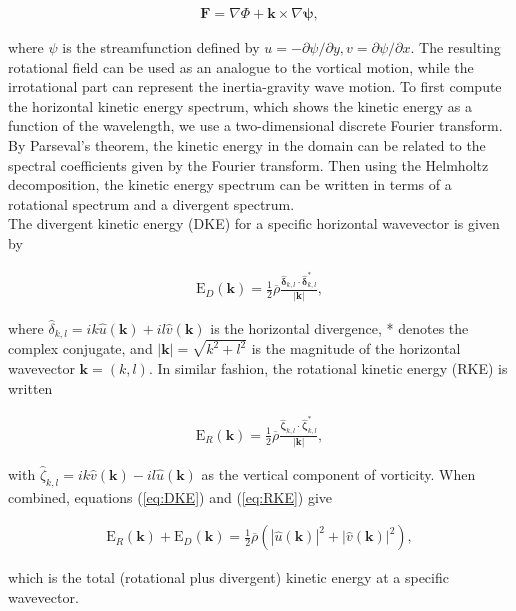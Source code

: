\begin{align}
\mathbf{F} = \nabla \Phi + \mathbf{k}\times \nabla \mathbf{\psi}, \label{eq:helmholtz}
\end{align}

where $\psi$ is the streamfunction defined by $u = -\partial \psi/\partial y, v = \partial \psi/\partial x$. The resulting rotational field can be used as an analogue to the vortical motion, while the irrotational part can represent the inertia-gravity wave motion. To first compute the horizontal kinetic energy spectrum, which shows the kinetic energy as a function of the wavelength, we use a two-dimensional discrete Fourier transform. By Parseval's theorem, the kinetic energy in the domain can be related to the spectral coefficients given by the Fourier transform. Then using the Helmholtz decomposition, the kinetic energy spectrum can be written in terms of a rotational spectrum and a divergent spectrum.\\

 The divergent kinetic energy (DKE) for a specific horizontal wavevector is given by

\begin{align}
\text{E}_D(\mathbf{k}) = \frac{1}{2} \overline{\rho} \frac{ \bm{\widehat{\delta}}_{k,l} \cdot \bm{\widehat{\delta}}_{k,l}^*}{|\mathbf{k}|}, \label{eq:DKE}
\end{align}

where $\widehat{\delta}_{k,l} = ik\widehat{u}(\mathbf{k}) + il\widehat{v}(\mathbf{k})$ is the horizontal divergence, * denotes the complex conjugate, and $|\mathbf{k}| = \sqrt{k^2 + l^2}$ is the magnitude of the horizontal wavevector  $\mathbf{k} = (k,l)$. In similar fashion, the rotational kinetic energy (RKE) is written

\begin{align}
\text{E}_R (\mathbf{k})= \frac{1}{2} \overline{\rho} \frac{\bm{\widehat{\zeta}}_{k,l} \cdot \bm{\widehat{\zeta}}_{k,l}^*}{|\mathbf{k}|}, \label{eq:RKE}
\end{align}

with $\widehat{\zeta}_{k,l} = ik\widehat{v}(\mathbf{k}) - il\widehat{u}(\mathbf{k})$ as the vertical component of vorticity. When combined, equations (\ref{eq:DKE}) and (\ref{eq:RKE}) give

\begin{align}
\text{E}_R(\mathbf{k}) + \text{E}_D(\mathbf{k}) = \frac{1}{2} \overline{\rho} \left( |\widehat{u}(\mathbf{k})|^2 + |\widehat{v}(\mathbf{k})|^2 \right),
\end{align}

which is the total (rotational plus divergent) kinetic energy at a specific wavevector. 